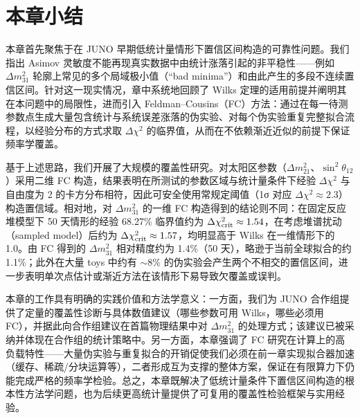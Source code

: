 \section{本章小结}
\label{sec:FC_summary}
本章首先聚焦于在 JUNO 早期低统计量情形下置信区间构造的可靠性问题。我们指出 Asimov 灵敏度不能再现真实数据中由统计涨落引起的非平稳性——例如 $\Delta m_{31}^2$ 轮廓上常见的多个局域极小值（“bad minima”）和由此产生的多段不连续置信区间。针对这一现实情况，章中系统地回顾了 Wilks 定理的适用前提并阐明其在本问题中的局限性，进而引入 Feldman–Cousins（FC）方法：通过在每一待测参数点生成大量包含统计与系统误差涨落的伪实验、对每个伪实验重复完整拟合流程，以经验分布的方式求取 $\Delta\chi^2$ 的临界值，从而在不依赖渐近近似的前提下保证频率学覆盖。

基于上述思路，我们开展了大规模的覆盖性研究。对太阳区参数（$\Delta m^2_{21}$、$\sin^2\theta_{12}$）采用二维 FC 构造，结果表明在所测试的参数区域与统计量条件下经验 $\Delta\chi^2$ 与自由度为 2 的卡方分布相符，因此可安全使用常规定阈值（1σ 对应 $\Delta\chi^2\approx 2.3$）构造置信域。相对地，对 $\Delta m^2_{31}$ 的一维 FC 构造得到的结论则不同：在固定反应堆模型下 50 天情形的经验 68.27\% 临界值约为 $\Delta\chi^2_{\rm crit}\approx 1.54$，在考虑堆谱扰动（sampled model）后约为 $\Delta\chi^2_{\rm crit}\approx 1.57$，均明显高于 Wilks 在一维情形下的 1.0。由 FC 得到的 $\Delta m^2_{31}$ 相对精度约为 1.4\%（50 天），略逊于当前全球拟合的约 1.1\%；此外在大量 toys 中约有 $\sim\!8\%$ 的伪实验会产生两个不相交的置信区间，进一步表明单次点估计或渐近方法在该情形下易导致欠覆盖或误判。

本章的工作具有明确的实践价值和方法学意义：一方面，我们为 JUNO 合作组提供了定量的覆盖性诊断与具体数值建议（哪些参数可用 Wilks，哪些必须用 FC），并据此向合作组建议在首篇物理结果中对 $\Delta m^2_{31}$ 的处理方式；该建议已被采纳并体现在合作组的统计策略中。另一方面，本章强调了 FC 研究在计算上的高负载特性——大量伪实验与重复拟合的开销促使我们必须在前一章实现拟合器加速（缓存、稀疏/分块运算等），二者形成互为支撑的整体方案，保证在有限算力下仍能完成严格的频率学检验。总之，本章既解决了低统计量条件下置信区间构造的根本性方法学问题，也为后续更高统计量提供了可复用的覆盖性检验框架与实用经验。
